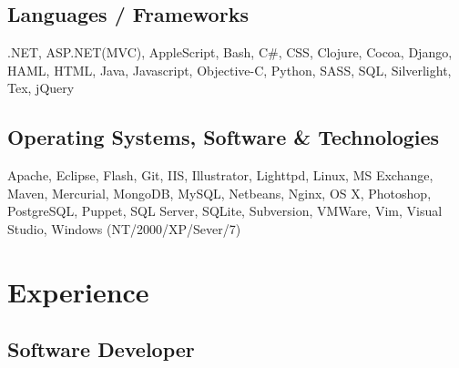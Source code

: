 \documentclass{article}
\begin{document}
\subsection*{Languages / Frameworks}
.NET, ASP.NET(MVC), AppleScript, Bash, C\#, CSS, Clojure, Cocoa, Django, HAML, HTML, Java, Javascript, Objective-C, Python, SASS, SQL, Silverlight, Tex, jQuery
\subsection*{Operating Systems, Software \& Technologies}
Apache, Eclipse, Flash, Git, IIS, Illustrator, Lighttpd, Linux, MS Exchange, Maven, Mercurial, MongoDB, MySQL, Netbeans, Nginx, OS X, Photoshop, PostgreSQL, Puppet, SQL Server, SQLite, Subversion, VMWare, Vim, Visual Studio, Windows (NT/2000/XP/Sever/7)
\section*{Experience}
\subsection*{Software Developer}
\end{document}
